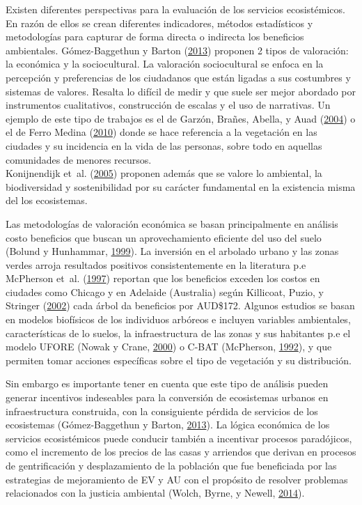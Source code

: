 \documentclass[12pt,a4paper,oneside, openany]{book}
\theoremstyle{definition}
\theoremstyle{definition}
\theoremstyle{definition}
\theoremstyle{remark}
\begin{document}
Existen diferentes perspectivas para la evaluación de los servicios
ecosistémicos. En razón de ellos se crean diferentes indicadores,
métodos estadísticos y metodologías para capturar de forma directa o
indirecta los beneficios ambientales. Gómez-Baggethun y Barton
(\protect\hyperlink{ref-gomez-baggethun_classifying_2013}{2013})
proponen 2 tipos de valoración: la económica y la sociocultural. La
valoración sociocultural se enfoca en la percepción y preferencias de
los ciudadanos que están ligadas a sus costumbres y sistemas de valores.
Resalta lo difícil de medir y que suele ser mejor abordado por
instrumentos cualitativos, construcción de escalas y el uso de
narrativas. Un ejemplo de este tipo de trabajos es el de Garzón, Brañes,
Abella, y Auad (\protect\hyperlink{ref-garzon2004vegetacion}{2004}) o el
de Ferro Medina
(\protect\hyperlink{ref-ferro_medina_arboles_2010}{2010}) donde se hace
referencia a la vegetación en las ciudades y su incidencia en la vida de
las personas, sobre todo en aquellas comunidades de menores recursos.\\
Konijnendijk et~al.
(\protect\hyperlink{ref-konijnendijk_arboles_2005}{2005}) proponen
además que se valore lo ambiental, la biodiversidad y sostenibilidad por
su carácter fundamental en la existencia misma del los ecosistemas.

Las metodologías de valoración económica se basan principalmente en
análisis costo beneficios que buscan un aprovechamiento eficiente del
uso del suelo (Bolund y Hunhammar,
\protect\hyperlink{ref-bolund_ecosystem_1999}{1999}). La inversión en el
arbolado urbano y las zonas verdes arroja resultados positivos
consistentemente en la literatura p.e McPherson et~al.
(\protect\hyperlink{ref-mcpherson_quantifying_1997}{1997}) reportan que
los beneficios exceden los costos en ciudades como Chicago y en Adelaide
(Australia) según Killicoat, Puzio, y Stringer
(\protect\hyperlink{ref-killicoat_economic_2002}{2002}) cada árbol da
beneficios por AUD\$172. Algunos estudios se basan en modelos biofísicos
de los individuos arbóreos e incluyen variables ambientales,
características de lo suelos, la infraestructura de las zonas y sus
habitantes p.e el modelo UFORE (Nowak y Crane,
\protect\hyperlink{ref-nowak_urban_2000}{2000}) o C-BAT (McPherson,
\protect\hyperlink{ref-mcpherson1992accounting}{1992}), y que permiten
tomar acciones específicas sobre el tipo de vegetación y su
distribución.

Sin embargo es importante tener en cuenta que este tipo de análisis
pueden generar incentivos indeseables para la conversión de ecosistemas
urbanos en infraestructura construida, con la consiguiente pérdida de
servicios de los ecosistemas (Gómez-Baggethun y Barton,
\protect\hyperlink{ref-gomez-baggethun_classifying_2013}{2013}). La
lógica económica de los servicios ecosistémicos puede conducir también a
incentivar procesos paradójicos, como el incremento de los precios de
las casas y arriendos que derivan en procesos de gentrificación y
desplazamiento de la población que fue beneficiada por las estrategias
de mejoramiento de EV y AU con el propósito de resolver problemas
relacionados con la justicia ambiental (Wolch, Byrne, y Newell,
\protect\hyperlink{ref-wolch_urban_2014}{2014}).
\end{document}
